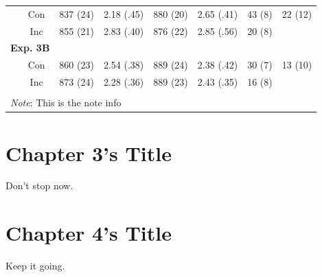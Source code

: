 \documentclass[]{DissertateCUNY}
\begin{document}
\begin{table}[htbp]
{\begin{tabular}{rrcccccc}
    & \multicolumn{1}{c}{Con} 
    & \multicolumn{1}{c}{837 (24)} 
    & \multicolumn{1}{c}{2.18 (.45)} 
    & \multicolumn{1}{c}{880 (20)} 
    & \multicolumn{1}{c}{2.65 (.41)} 
    & \multicolumn{1}{c}{43 (8)}
    & \multicolumn{1}{c}{22 (12)} \\
    & \multicolumn{1}{c}{Inc} 
    & \multicolumn{1}{c}{855 (21)} 
    & \multicolumn{1}{c}{2.83 (.40)} 
    & \multicolumn{1}{c}{876 (22)} 
    & \multicolumn{1}{c}{2.85 (.56)} 
    & \multicolumn{1}{c}{20 (8)} &  \\
    \multicolumn{2}{c}{\textbf{Exp. 3B}} &       &       &       &       &       &  \\
    & \multicolumn{1}{c}{Con} 
    & \multicolumn{1}{c}{860 (23)} 
    & \multicolumn{1}{c}{2.54 (.38)} 
    & \multicolumn{1}{c}{889 (24)} 
    & \multicolumn{1}{c}{2.38 (.42)} 
    & \multicolumn{1}{c}{30 (7)} 
    & \multicolumn{1}{c}{13 (10)} \\
    & \multicolumn{1}{c}{Inc} 
    & \multicolumn{1}{c}{873 (24)} 
    & \multicolumn{1}{c}{2.28 (.36)} 
    & \multicolumn{1}{c}{889 (23)} 
    & \multicolumn{1}{c}{2.43 (.35)} 
    & \multicolumn{1}{c}{16 (8)} &  \\
    &       &       &       &       &       &       &  \\
    \bottomrule
    \multicolumn{8}{l}{\textit{Note}: This is the note info} \\
    \end{tabular}}%
  \label{tab:addlabel}%
\end{table}

\FloatBarrier

\newpage
{}
\fancyhead[R]{\thepage}
\fancyfoot[C]{}

\chapter{Chapter 3's Title}

Don't stop now.

\FloatBarrier
\newpage
{}
\fancyhead[R]{\thepage}
\fancyfoot[C]{}

\chapter{Chapter 4's Title}

Keep it going.

\FloatBarrier
\newpage
{}
\fancyhead[R]{\thepage}
\fancyfoot[C]{}
\end{document}
